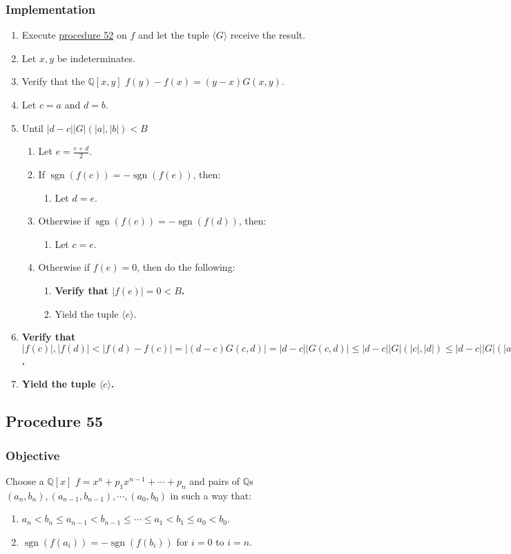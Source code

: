 \documentclass[twocolumn]{article}
\DeclareMathOperator{\sgn}{sgn}
\newcommand{\procedure}[2][]{\subsection*{Procedure #2 \ifthenelse{\equal{#1}{}}{}{(#1)}}\label{sec:procedure #2}}
\newcommand{\objective}{\subsubsection*{Objective}}
\newcommand{\implementation}{\subsubsection*{Implementation}}
\begin{document}
			\implementation
				\begin{enumerate}
					\item Execute \hyperref[sec:procedure 52]{procedure 52} on $f$ and let the tuple $\langle G\rangle$ receive the result.
					\item Let $x,y$ be indeterminates.
					\item Verify that the $\mathbb{Q}[x,y]$ $f(y)-f(x)=(y-x)G(x,y)$.
					\item Let $c=a$ and $d=b$.
					\item Until $\lvert d-c\rvert \lvert G\rvert(\lvert a\rvert,\lvert b\rvert)<B$
					\begin{enumerate}
						\item Let $e=\frac{c+d}{2}$.
						\item If $\sgn(f(c))=-\sgn(f(e))$, then:
						\begin{enumerate}
							\item Let $d=e$.
						\end{enumerate}
						\item Otherwise if $\sgn(f(e))=-\sgn(f(d))$, then:
						\begin{enumerate}
							\item Let $c=e$.
						\end{enumerate}
						\item Otherwise if $f(e)=0$, then do the following:
						\begin{enumerate}
							\item \textbf{Verify that $\lvert f(e)\rvert=0<B$.}
							\item Yield the tuple $\langle e\rangle$.
						\end{enumerate}
					\end{enumerate}
					\item \textbf{Verify that $\lvert f(c)\rvert,\lvert f(d)\rvert<\lvert f(d)-f(c)\rvert=\lvert(d-c)G(c,d)\rvert=\lvert d-c\rvert\lvert G(c,d)\rvert\le\lvert d-c\rvert\lvert G\rvert(\lvert c\rvert,\lvert d\rvert)\le\lvert d-c\rvert\lvert G\rvert(\lvert a\rvert,\lvert b\rvert)<B$.}
					\item \textbf{Yield the tuple $\langle c\rangle$.}
				\end{enumerate}
		\procedure{55}
			\objective
				Choose a $\mathbb{Q}[x]$ $f=x^n+p_1x^{n-1}+\cdots+p_n$ and pairs of $\mathbb{Q}$s $(a_n,b_n),(a_{n-1},b_{n-1}),\cdots,(a_0,b_0)$ in such a way that:
				\begin{enumerate}
					\item $a_n<b_n\le a_{n-1}<b_{n-1}\le\cdots\le a_1<b_1\le a_0<b_0$.
					\item $\sgn(f(a_i))=-\sgn(f(b_i))$ for $i=0$ to $i=n$.
				\end{enumerate}
\end{document}
